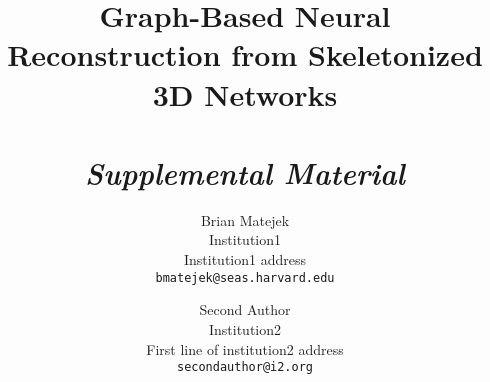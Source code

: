 \documentclass[10pt,twocolumn,letterpaper]{article}
\begin{document}
\title{Graph-Based Neural Reconstruction from Skeletonized 3D Networks\\~\\\textit{Supplemental Material}}

\author{Brian Matejek\\
Institution1\\
Institution1 address\\
{\tt\small bmatejek@seas.harvard.edu}
\and
Second Author\\
Institution2\\
First line of institution2 address\\
{\tt\small secondauthor@i2.org}
}

\maketitle








{\small


}
\end{document}
